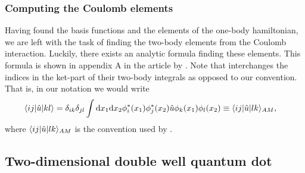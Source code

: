         \subsubsection{Computing the Coulomb elements}
            Having found the basis functions and the elements of the one-body
            hamiltonian, we are left with the task of finding the two-body
            elements from the Coulomb interaction. Luckily, there exists an
            analytic formula finding these elements. This formula is shown in
            appendix A in the article  by
            \citeauthor{anisimovas1998energy} \cite{anisimovas1998energy}. Note
            that \citeauthor{anisimovas1998energy} interchanges the indices in
            the ket-part of their two-body integrals as opposed to our
            convention. That is, in our notation we would write
            \begin{align}
                \langle ij |\hat{u}| kl \rangle
                &= \delta_{ik}\delta_{jl}
                \int\mathrm{d} x_1\mathrm{d} x_2
                \phi_{i}^{*}(x_1) \phi_{j}^{*}(x_2)
                \hat{u}
                \phi_{k}(x_1)\phi_{l}(x_2)
                \equiv
                \langle ij |\hat{u}| lk \rangle_{AM},
            \end{align}
            where $ \langle ij |\hat{u}| lk \rangle_{AM}$ is the convention used by
            \citeauthor{anisimovas1998energy}.


    \subsection{Two-dimensional double well quantum dot}
